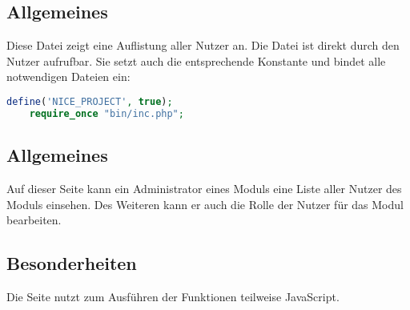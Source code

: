 \subsection{Allgemeines} Diese Datei zeigt eine Auflistung aller Nutzer an.
Die Datei ist direkt durch den Nutzer aufrufbar. Sie setzt auch die entsprechende Konstante und bindet alle notwendigen Dateien ein:
\begin{lstlisting}[language=php]
	define('NICE_PROJECT', true);
	require_once "bin/inc.php";
\end{lstlisting}
\subsection{Allgemeines}
Auf dieser Seite kann ein Administrator eines Moduls eine Liste aller Nutzer des Moduls einsehen. Des Weiteren kann er auch die Rolle der Nutzer für das Modul bearbeiten.
\subsection{Besonderheiten}
Die Seite nutzt zum Ausführen der Funktionen teilweise JavaScript.
